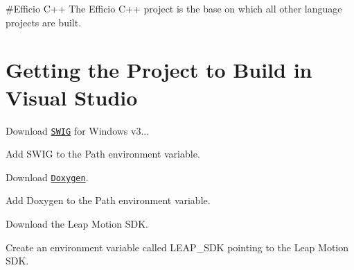 \#\+Efficio C++ The Efficio C++ project is the base on which all other language projects are built.

\section*{Getting the Project to Build in Visual Studio }


\begin{DoxyEnumerate}
\item Download \href{http://swig.org/download}{\tt S\+W\+IG} for Windows v3...
\end{DoxyEnumerate}
\begin{DoxyEnumerate}
\item Add S\+W\+IG to the Path environment variable.
\end{DoxyEnumerate}
\begin{DoxyEnumerate}
\item Download \href{http://doxygen.org}{\tt Doxygen}.
\end{DoxyEnumerate}
\begin{DoxyEnumerate}
\item Add Doxygen to the Path environment variable.
\end{DoxyEnumerate}
\begin{DoxyEnumerate}
\item Download the Leap Motion S\+DK.
\end{DoxyEnumerate}
\begin{DoxyEnumerate}
\item Create an environment variable called L\+E\+A\+P\+\_\+\+S\+DK pointing to the Leap Motion S\+DK. 
\end{DoxyEnumerate}